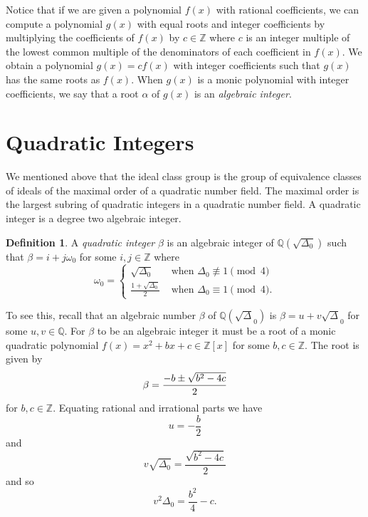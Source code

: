 \documentclass{ucalgthes1}
\theoremstyle{plain}
\theoremstyle{definition}
\newtheorem{defn}[thm]{Definition}
\newcommand{\ZZ}{\mathbb{Z}}
\newcommand{\QQ}{\mathbb{Q}}
\begin{document}
Notice that if we are given a polynomial $f(x)$ with rational coefficients, we can compute a polynomial $g(x)$ with equal roots and integer coefficients by multiplying the coefficients of $f(x)$ by $c \in \ZZ$ where $c$ is an integer multiple of the lowest common multiple of the denominators of each coefficient in $f(x)$.  We obtain a polynomial $g(x) = cf(x)$ with integer coefficients such that $g(x)$ has the same roots as $f(x)$.  When $g(x)$ is a monic polynomial with integer coefficients, we say that a root $\alpha$ of $g(x)$ is an \emph{algebraic integer}.


\bigbreak
\section{Quadratic Integers}

We mentioned above that the ideal class group is the group of equivalence classes of ideals of the maximal order of a quadratic number field.  The maximal order is the largest subring of quadratic integers in a quadratic number field.  A quadratic integer is a degree two algebraic integer.

\begin{defn}
\label{defn:quadraticInteger}
A \emph{quadratic integer} $\beta$ is an algebraic integer of $\QQ(\sqrt{\Delta_0})$ such that $\beta = i + j \omega_0$ for some $i,j \in \ZZ$ where
\begin{equation*}
	\omega_0 = \begin{cases}
		\sqrt{\Delta_0} & \textrm{ when } \Delta_0 \not \equiv 1 \pmod 4 \\
		\frac{1+\sqrt{\Delta_0}}{2} & \textrm{ when } \Delta_0 \equiv 1 \pmod 4.
	\end{cases}
\end{equation*}
\end{defn}

\noindent
To see this, recall that an algebraic number $\beta$ of $\QQ(\sqrt\Delta_0)$ is $\beta = u+v\sqrt\Delta_0$ for some $u,v \in \QQ$.  For $\beta$ to be an  algebraic integer it must be a root of a monic quadratic polynomial $f(x) = x^2+bx+c \in \ZZ[x]$ for some $b,c \in \ZZ$.  The root is given by
\begin{equation*}
	\beta = \frac{-b \pm \sqrt{b^2-4c}}{2} \\
\end{equation*}
for $b,c \in \ZZ$. Equating rational and irrational parts we have
\begin{equation*}
	u = -\frac{b}{2}
\end{equation*}
and
\begin{equation*}
	v \sqrt{\Delta_0} = \frac{\sqrt{b^2 -4c}}{2}
\end{equation*}
and so
\begin{equation*}
	v^2 \Delta_0 = \frac{b^2}{4} - c.
\end{equation*}
\end{document}
